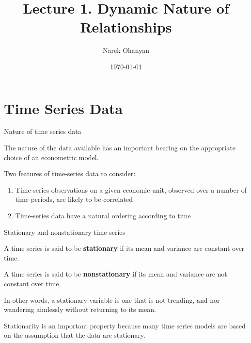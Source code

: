 \documentclass[10pt,aspectratio=169]{beamer}  %
\author[Narek Ohanyan]{Narek Ohanyan}
\title[Dynamic Nature of Relationships]{Lecture 1. Dynamic Nature of Relationships}
\institute[AUA]{American University of Armenia}
\date{\today}
\begin{document}
\begin{frame}
    \titlepage
\end{frame}


\section{Time Series Data}

\begin{frame}{Nature of time series data}

    \bigskip

    The nature of the data available has an important bearing on the appropriate choice of an econometric model.

    Two features of time-series data to consider:
    \begin{enumerate}\itemsep=1em
        \item Time-series observations on a given economic unit, observed over a number of time periods, are likely to be correlated
        \item Time-series data have a natural ordering according to time
    \end{enumerate}

\end{frame}


\begin{frame}{Stationary and nonstationary time series}

    \bigskip

    A time series is said to be \textbf{stationary} if its mean and variance are constant over time.

    \medskip
    A time series is said to be \textbf{nonstationary} if its mean and variance are not constant over time.

    \medskip
    In other words, a stationary variable is one that is not trending, and nor wandering aimlessly without returning to its mean.

    \medskip
    Stationarity is an important property because many time series models are based on the assumption that the data are stationary.

\end{frame}

\end{document}
